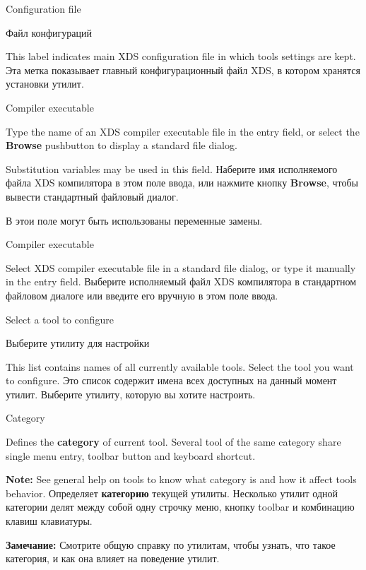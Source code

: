 \begin{popup}
\ifenglish
\caption{Configuration file}
 \else
\caption{Файл конфигураций}
\fi
{}
\ifenglish
This label indicates main XDS configuration file in which tools settings are kept.
 \else
Эта метка показывает главный конфигурационный файл XDS, в котором хранятся установки
утилит.
\fi
\end{popup}

\begin{popup}
\caption{Compiler executable}

\ifenglish
Type the name of an XDS compiler executable file in the entry field,
or select the {\bf Browse} pushbutton to display a standard file dialog.

Substitution variables may be used in this field.
 \else
Наберите имя исполняемого файла XDS компилятора в этом поле ввода,
или нажмите кнопку {\bf Browse}, чтобы вывести стандартный файловый диалог.

В этои поле могут быть использованы переменные замены.
\fi
\end{popup}

\begin{popup}
\caption{Compiler executable}

\ifenglish
Select XDS compiler executable file in a standard file dialog,
or type it manually in the entry field.
 \else
Выберите исполняемый файл XDS компилятора в стандартном файловом диалоге 
или введите его вручную в этом поле ввода.
\fi
\end{popup}

\begin{popup}
\ifenglish
\caption{Select a tool to configure}
 \else
\caption{Выберите утилиту для настройки}
\fi
{}

\ifenglish
This list contains names of all currently available tools. Select
the tool you want to configure.
 \else
Это список содержит имена всех доступных на данный момент утилит. Выберите 
утилиту, которую вы хотите настроить.
\fi
\end{popup}

\begin{popup}
\caption{Category}

\ifenglish
Defines the {\bf category} of current tool. Several tool of the same category
share single menu entry, toolbar button and keyboard shortcut.

{\bf Note:} See general help on tools to know what category is and how it
affect tools behavior.
 \else
Определяет {\bf категорию} текущей утилиты. Несколько утилит одной категории
делят между собой одну строчку меню, кнопку toolbar и комбинацию клавиш 
клавиатуры. 

{\bf Замечание:} Смотрите общую справку по утилитам, чтобы узнать, что такое 
категория, и как она влияет на поведение утилит.
\fi
\end{popup}

